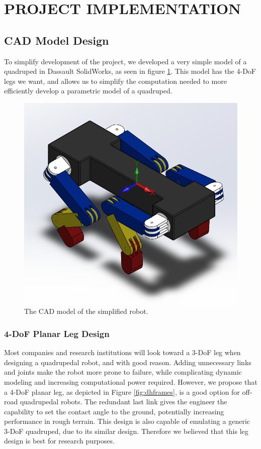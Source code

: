\section{PROJECT IMPLEMENTATION}
\subsection{CAD Model Design} \label{sec:CAD Model Design}
To simplify development of the project, we developed a very simple model of a quadruped in Dassault SolidWorks, as seen in figure \ref{fig:cadmodel}. This model has the 4-DoF legs we want, and allows us to simplify the computation needed to more efficiently develop a parametric model of a quadruped.

\begin{figure}[thpb]
    \parbox{\linewidth}{\includegraphics[width=\linewidth]{Figures/robot.png}}
    \caption{The CAD model of the simplified robot.}
    \label{fig:cadmodel}
\end{figure}

\subsubsection*{4-DoF Planar Leg Design} \label{sec:legdesign}
Most companies and research institutions will look toward a 3-DoF leg when designing a quadrupedal robot, and with good reason. Adding unnecessary links and joints make the robot more prone to failure, while complicating dynamic modeling and increasing computational power required. However, we propose that a 4-DoF planar leg, as depicted in Figure \ref{fig:dhframes}, is a good option for off-road quadrupedal robots. The redundant last link gives the engineer the capability to set the contact angle to the ground, potentially increasing performance in rough terrain. This design is also capable of emulating a generic 3-DoF quadruped, due to its similar design. Therefore we believed that this leg design is best for research purposes.

